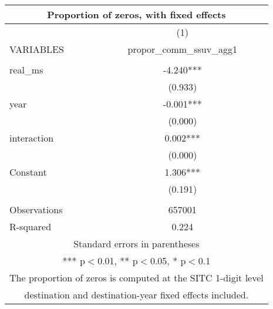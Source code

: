 \begin{tabular}{lc}
\multicolumn{2}{c}{Proportion of zeros, with fixed effects} \\ \hline
 & (1) \\
VARIABLES & propor\_comm\_ssuv\_agg1 \\ \hline
 &  \\
real\_ms & -4.240*** \\
 & (0.933) \\
year & -0.001*** \\
 & (0.000) \\
interaction & 0.002*** \\
 & (0.000) \\
Constant & 1.306*** \\
 & (0.191) \\
 &  \\
Observations & 657001 \\
 R-squared & 0.224 \\ \hline
\multicolumn{2}{c}{ Standard errors in parentheses} \\
\multicolumn{2}{c}{ *** p$<$0.01, ** p$<$0.05, * p$<$0.1} \\
\multicolumn{2}{c}{ The proportion of zeros is computed at the SITC 1-digit level} \\
\multicolumn{2}{c}{ destination and destination-year fixed effects included.} \\
\end{tabular}
